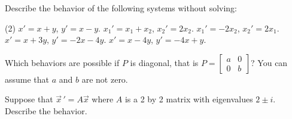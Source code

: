 \documentclass{ximera}
\begin{document}
\begin{exercise}%
    Describe the behavior of the following systems without solving:
    \begin{tasks}(2)
        \task $x' = x + y$, \quad $y' = x-y$.
        \task $x_1' = x_1 + x_2$, \quad $x_2' = 2 x_2$.
        \task $x_1' = -2x_2$, \quad $x_2' = 2 x_1$.
        \task $x' = x + 3y$, \quad $y' = -2x-4y$.
        \task $x' = x - 4y$, \quad $y' = -4x+y$.
    \end{tasks}
\end{exercise}

\begin{exercise}
    Which behaviors are possible if $P$ is diagonal, that is $P = \left[ \begin{smallmatrix} a & 0 \\ 0 & b \end{smallmatrix} \right]$? You can assume that $a$ and $b$ are not zero.
\end{exercise}

\begin{exercise}%
    Suppose that $\vec{x}\,' = A \vec{x}$ where $A$ is a 2 by 2 matrix with eigenvalues $2\pm i$.  Describe the behavior.
\end{exercise}
\end{document}
